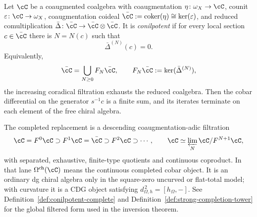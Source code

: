 \begin{definition}\label{def:conilpotent-cobar}
Let $\cC$ be a coaugmented coalgebra with coaugmentation
$\eta\colon\omega_X\to\cC$, counit
$\varepsilon\colon\cC\to\omega_X$, coaugmentation coideal
$\bar\cC:=\operatorname{coker}(\eta)\cong\ker(\varepsilon)$,
and reduced comultiplication
$\bar\Delta\colon\bar\cC\to\bar\cC\otimes\bar\cC$.
It is \emph{conilpotent} if for every local section
$c\in\bar\cC$ there is $N=N(c)$ such that
\[
\bar\Delta^{(N)}(c)=0 .
\]
Equivalently,
\[
\bar\cC=\bigcup_{N\geq 0}F_N\bar\cC,\qquad
F_N\bar\cC:=\ker(\bar\Delta^{(N)}),
\]
the increasing coradical filtration exhausts the reduced coalgebra.
Then the cobar differential on the generator $s^{-1}c$ is a finite
sum, and its iterates terminate on each element of the free chiral
algebra.

The completed replacement is a descending coaugmentation-adic
filtration
\[
\cC=F^0\cC\supset F^1\cC=\bar\cC\supset F^2\cC\supset\cdots,
\qquad
\cC\simeq\varprojlim_N \cC/F^{N+1}\cC,
\]
with separated, exhaustive, finite-type quotients and continuous
coproduct. In that lane $\Omega^{\mathrm{ch}}(\cC)$ means the
continuous completed cobar object. It is an ordinary dg chiral algebra
only in the square-zero uncurved or flat-total model; with curvature it
is a CDG object satisfying
$d_{\Omega,h}^{\,2}=[h_\Omega,-]$.
See Definition~\ref{def:conilpotent-complete} and
Definition~\ref{def:strong-completion-tower} for the global filtered
form used in the inversion theorem.
\end{definition}

